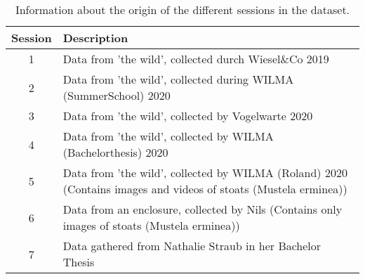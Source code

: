 \begin{table}[H]
\caption{Information about the origin of the different sessions in the dataset.}
\label{tab:session_info}
\begin{tabular}{c p{12cm}}
\toprule
Session & Description \\
\midrule
1 & Data from 'the wild', collected durch Wiesel\&Co 2019 \\
2 & Data from 'the wild', collected during WILMA (SummerSchool) 2020 \\
3 & Data from 'the wild', collected by Vogelwarte 2020 \\
4 & Data from 'the wild', collected by WILMA (Bachelorthesis) 2020 \\
5 & Data from 'the wild', collected by WILMA (Roland) 2020 (Contains images and videos of stoats (Mustela erminea)) \\
6 & Data from an enclosure, collected by Nils (Contains only images of stoats (Mustela erminea)) \\
7 & Data gathered from Nathalie Straub in her Bachelor Thesis \\
\bottomrule
\end{tabular}
\end{table}
